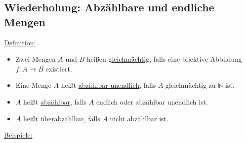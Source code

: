 \subsection*{Wiederholung: Abzählbare und endliche Mengen}
\underline{Definition:}
\begin{itemize}[noitemsep]
	\item Zwei Mengen $A$ und $B$ heißen \underline{gleichmächtig}, falls eine bijektive Abbildung \mbox{$f: A\rightarrow B$} existiert.\\
	\item Eine Menge $A$ heißt \underline{abzählbar unendlich}, falls $A$ gleichmächtig zu $\mathbb{N}$ ist.\\
	\item $A$ heißt \underline{abzählbar}, falls $A$ endlich oder abzählbar unendlich ist.\\
	\item $A$ heißt \underline{überabzählbar}, falls $A$ nicht abzählbar ist.
\end{itemize}
\underline{Beispiele:}
